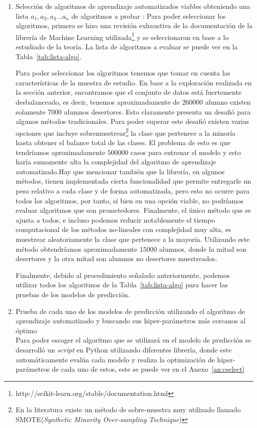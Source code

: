 \begin{enumerate}
\item Selección de algoritmos de aprendizaje automatizados viables obteniendo una lista $a_1,a_2,a_3 ... a_n$ de algoritmos a probar : Para poder seleccionar los algoritmos, primero se hizo una revisión exhaustiva de la documentación de la librería de Machine Learning utilizada\footnote{http://scikit-learn.org/stable/documentation.html} y se seleccionaron en base a lo estudiado de la teoría. La lista de algoritmos a evaluar se puede ver en la Tabla~\ref{tab:lista-algo}.

Para poder seleccionar los algoritmos tenemos que tomar en cuenta las características de la muestra de estudio. En base a la exploración realizada en la sección anterior, encontramos que el conjunto de datos está fuertemente desbalanceado, es decir, tenemos aproximadamente de $260000$ alumno existen solamente $7000$ alumnos desertores. Esto claramente presenta un desafió para algunos métodos tradicionales. Para poder superar este desafió existen varias opciones que incluye sobremuestrear\footnote{En la literatura existe un método de sobre-muestra muy utilizado llamado SMOTE(\textit{Synthetic Minority Over-sampling Technique})} la clase que pertenece a la minoría hasta obtener el balance total de las clases. El problema de esto es que tendríamos aproximadamente $500000$ casos para entrenar el modelo y esto haría sumamente alta la complejidad del algoritmo de aprendizaje automatizado.Hay que mencionar también que la librería, en algunos métodos, tienen implementada cierta funcionalidad que permite entregarle un peso relativo a cada clase y de forma automatizada, pero esto no ocurre para todos los algoritmos, por tanto, si bien en una opción viable, no podríamos evaluar algoritmos que son prometedores. Finalmente, el único método que se ajusta a todos, e incluso podemos reducir notablemente el tiempo computacional de los métodos no-lineales con complejidad muy alta, es muestrear aleatoriamente la clase que pertenece a la mayoría. Utilizando este método obtendríamos aproximadamente $15000$ alumnos, donde la mitad son desertores y la otra mitad son alumnos no desertores muestreados.

Finalmente, debido al procedimiento señalado anteriormente, podemos utilizar todos los algoritmos de la Tabla~\ref{tab:lista-algo} para hacer las pruebas de los modelos de predicción.

\item Prueba de cada uno de los modelos de predicción utilizando el algoritmo de aprendizaje automatizado y buscando sus hiper-parámetros más cercanos al óptimo \\ \hfill
Para poder escoger el algoritmo que se utilizará en el modelo de predicción se desarrolló un \textit{script} en Python utilizando diferentes librería, donde este automáticamente evalúa cada modelo y realiza la optimización de hiper-parámetros de cada uno de estos, este se puede ver en el Anexo~\ref{an:cselect}


\end{enumerate}
